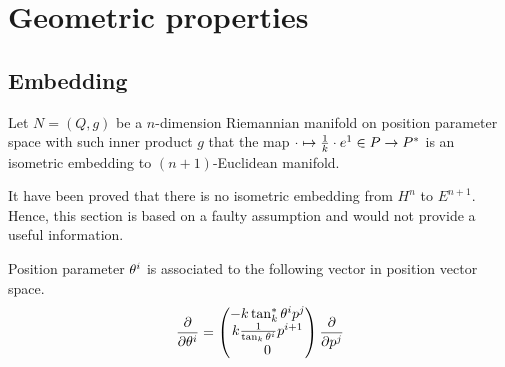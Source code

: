 \documentclass[../main.tex]{subfiles}
\begin{document}
\section{Geometric properties}
\subsection{Embedding}
\begin{definition}\label{M:Embedding}
    Let $N=\left(Q,g\right)$ be a $n$-dimension Riemannian manifold
    on position parameter space with such inner product $g$ that
    the map $\cdot\mapsto\frac{1}{k}\cdot\tensor{e}{^1}\in P\to P^\ast$ is an isometric embedding to $\left(n+1\right)$-Euclidean manifold.
\end{definition}
\begin{remark}
    It have been proved that there is no isometric embedding from $H^n$ to $E^{n+1}$.
    Hence, this section is based on a faulty assumption and would not provide a useful information.
\end{remark}
\begin{lemma}\label{M:Tangent:Basis}
    Position parameter $\tensor{\theta}{^i}$ is associated to the following vector in position vector space.
    \begin{equation*}
        \frac{\partial}{\partial\tensor{\theta}{^i}} =
        \begin{pmatrix}
            -k\tan_k^\ast\tensor{\theta}{^i}\tensor{p}{^j}         \\
            k\frac{1}{\tan_k\tensor{\theta}{^i}}\tensor{p}{^{i+1}} \\
            0
        \end{pmatrix} \frac{\partial}{\partial\tensor{p}{^j}}
    \end{equation*}
\end{lemma}
\end{document}
